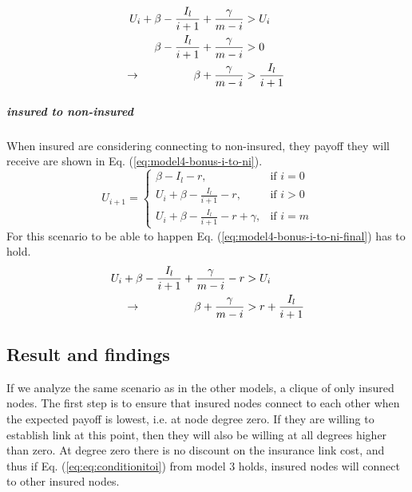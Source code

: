 \begin{eqnarray}
U_{i}+\beta-\frac{I_{l}}{i+1}+\frac{\gamma}{m-i}&>U_{i} \nonumber \\ 
\beta-\frac{I_{l}}{i+1}+\frac{\gamma}{m-i}&>0 \nonumber \\ 
\llap{$\rightarrow$\hspace{50pt}}\beta +\frac{\gamma}{m-i}&>\frac{I_{l}}{i+1}
\label{eq:model4-bonus-i-to-i}
\end{eqnarray}

\subparagraph{insured to non-insured}
When insured are considering connecting to non-insured, they payoff they will receive are shown in Eq. (\ref{eq:model4-bonus-i-to-ni}).
\begin{equation}
U_{i+1}= 
\begin{cases}
    \beta - I_{l}-r,& \text{if } i = 0\\
    U_{i}+\beta -\frac{I_{l}}{i+1}-r,& \text{if }  i>0\\
    U_{i}+\beta -\frac{I_{l}}{i+1}-r+\gamma,& \text{if } i=m
\end{cases}
\label{eq:model4-bonus-i-to-ni}
\end{equation}
For this scenario to be able to happen Eq. (\ref{eq:model4-bonus-i-to-ni-final}) has to hold.
\begin{eqnarray}
U_{i}+\beta-\frac{I_{l}}{i+1}+\frac{\gamma}{m-i}-r&>U_{i} \nonumber \\ 
\llap{$\rightarrow$\hspace{50pt}}\beta+\frac{\gamma}{m-i}&>r+\frac{I_{l}}{i+1}
\label{eq:model4-bonus-i-to-ni-final}
\end{eqnarray}
\subsection{Result and findings}
If we analyze the same scenario as in the other models, a clique of only insured nodes. The first step is to ensure that insured nodes connect to each other when the expected payoff is lowest, i.e. at node degree zero. If they are willing to establish link at this point, then they will also be willing at all degrees higher than zero.
At degree zero there is no discount on the insurance link cost, and thus if Eq. (\ref{eq:eq:conditionitoi}) from model 3 holds, insured nodes will connect to other insured nodes.


